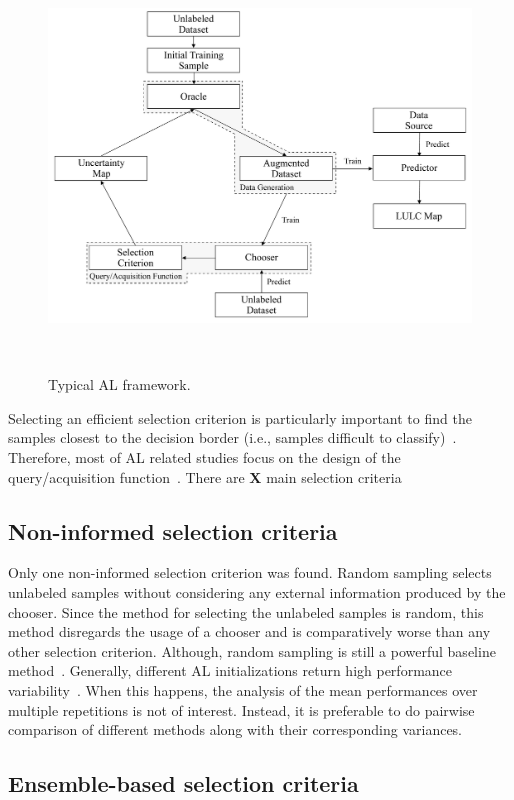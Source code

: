 \documentclass[parskip=full]{scrartcl}
\begin{document}
\begin{figure}[htb]
	\centering
	\includegraphics[width=.85\linewidth]{../analysis/al_typical}
	\caption{Typical AL framework.
    }~\label{fig:al_typical}
\end{figure}

Selecting an efficient selection criterion is particularly important to find the samples closest
to the decision border (i.e., samples difficult to classify)~\cite{Shrivastava2021}. Therefore, most
of AL related studies focus on the design of the query/acquisition function~\cite{Su2020}. There are
\textbf{X} main selection criteria

\subsection{Non-informed selection criteria}

Only one non-informed selection criterion was found. Random sampling selects unlabeled samples
without considering any external information produced by the chooser. Since the method for selecting
the unlabeled samples is random, this method disregards the usage of a chooser and is comparatively
worse than any other selection criterion. Although, random sampling is still a powerful baseline
method~\cite{Cawley2011}. Generally, different AL initializations return high performance
variability~\cite{Kottke2017}. When this happens, the analysis of the mean performances over multiple
repetitions is not of interest. Instead, it is preferable to do pairwise comparison of different
methods along with their corresponding variances. 

\subsection{Ensemble-based selection criteria}
\end{document}
